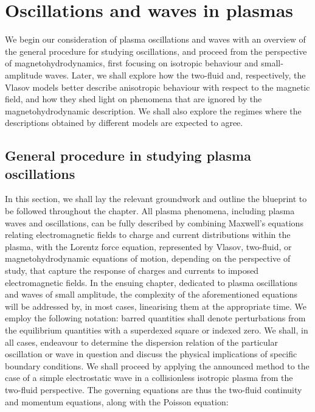 \chapter{Oscillations and waves in plasmas}

\label{plasma-waves}

We begin our consideration of plasma oscillations and waves with an overview of the general procedure for studying oscillations, and proceed from the perspective of magnetohydrodynamics, first focusing on isotropic behaviour and small-amplitude waves. Later, we shall explore how the two-fluid and, respectively, the Vlasov models better describe anisotropic behaviour with respect to the magnetic field, and how they shed light on phenomena that are ignored by the magnetohydrodynamic description. We shall also explore the regimes where the descriptions obtained by different models are expected to agree.

\section{General procedure in studying plasma oscillations}

In this section, we shall lay the relevant groundwork and outline the blueprint to be followed throughout the chapter. All plasma phenomena, including plasma waves and oscillations, can be fully described by combining Maxwell's equations relating electromagnetic fields to charge and current distributions within the plasma, with the Lorentz force equation, represented by Vlasov, two-fluid, or magnetohydrodynamic equations of motion, depending on the perspective of study, that capture the response of charges and currents to imposed electromagnetic fields. In the ensuing chapter, dedicated to plasma oscillations and waves of small amplitude, the complexity of the aforementioned equations will be addressed by, in most cases, linearising them at the appropriate time. We employ the following notation: barred quantities shall denote perturbations from the equilibrium quantities with a superdexed square or indexed zero. We shall, in all cases, endeavour to determine the dispersion relation of the particular oscillation or wave in question and discuss the physical implications of specific boundary conditions. We shall proceed by applying the announced method to the case of a simple electrostatic wave in a collisionless isotropic plasma from the two-fluid perspective. The governing equations are thus the two-fluid continuity and momentum equations, along with the Poisson equation:

